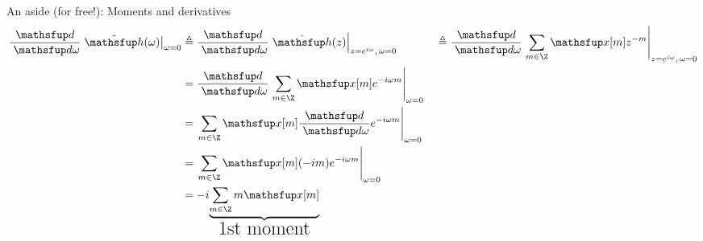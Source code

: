 \newpage
An aside (for free!): Moments and derivatives
\begin{align*}
  \ddw\brlr{\Fh(\omega)}_{\omega=0}
    &\eqd \ddw\brlr{\Zh(z)}_{z=e^{i\omega},\,\omega=0}
   &&\eqd \ddw\brlr{\sum_{m\in\Z} \fx[m] z^{-m}}_{z=e^{i\omega},\,\omega=0}
  \\&= \ddw\brlr{\sum_{m\in\Z} \fx[m] e^{-i\omega m}}_{\omega=0}
  \\&= \brlr{\sum_{m\in\Z} \fx[m] \ddw e^{-i\omega m}}_{\omega=0}
  \\&= \brlr{\sum_{m\in\Z} \fx[m] (-im) e^{-i\omega m}}_{\omega=0}
  \\&= -i \mcom{\sum_{m\in\Z} m \fx[m]}
               {\LARGE 1st moment}
\end{align*}
\vfill\mbox{}


